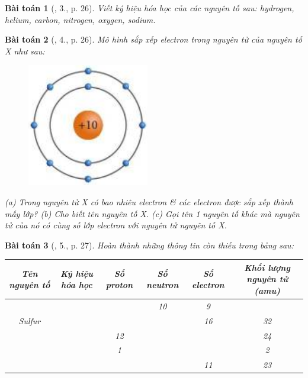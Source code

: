\documentclass{article}
\newtheorem{baitoan}{Bài toán}
\begin{document}
\begin{baitoan}[\cite{SGK_KHTN_7_Canh_Dieu}, 3., p. 26]
	Viết ký hiệu hóa học của các nguyên tố sau: hydrogen, helium, carbon, nitrogen, oxygen, sodium.
\end{baitoan}

\begin{baitoan}[\cite{SGK_KHTN_7_Canh_Dieu}, 4., p. 26]
	Mô hình sắp xếp electron trong nguyên tử của nguyên tố X như sau:
	\begin{figure}[H]
		\centering
		\includegraphics[scale=0.3]{SGK_KHTN_7_CD_p_26}
	\end{figure}
	\noindent(a) Trong nguyên tử X có bao nhiêu electron \& các electron được sắp xếp thành mấy lớp? (b) Cho biết tên nguyên tố X. (c) Gọi tên 1 nguyên tố khác mà nguyên tử của nó có cùng số lớp electron với nguyên tử nguyên tố X.
\end{baitoan}

\begin{baitoan}[\cite{SGK_KHTN_7_Canh_Dieu}, 5., p. 27]
	Hoàn thành những thông tin còn thiếu trong bảng sau:
	\begin{table}[H]
		\centering
		\begin{tabular}{|c|c|c|c|c|c|}
			\hline
			 Tên nguyên tố & Ký hiệu hóa học & Số proton & Số neutron & Số electron & Khối lượng nguyên tử (amu) \\
			\hline
			&  &  & 10 & 9 &  \\
			\hline
			Sulfur &  &  &  & 16 & 32 \\
			\hline
			&  & 12 &  &  & 24 \\
			\hline
			&  & 1 &  &  & 2 \\
			\hline
			&  &  &  & 11 & 23 \\
			\hline
		\end{tabular}
	\end{table}
\end{baitoan}
\end{document}

